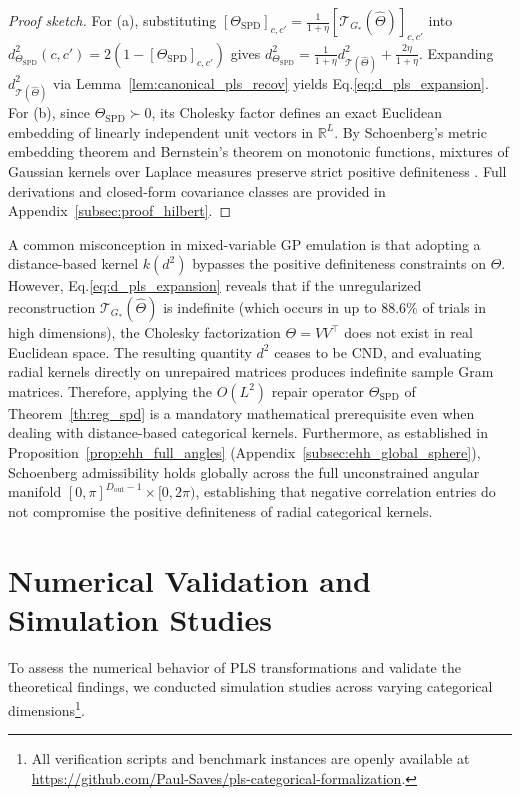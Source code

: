 \documentclass[default,sn-mathphys,Numbered]{sn-jnl}
\theoremstyle{thmstyleone}
\theoremstyle{thmstylethree}
\theoremstyle{thmstyletwo}
\newcommand{\outp}{\text{out}}
\newcommand{\eqnref}[1]{\eqref{#1}}
\begin{document}
\begin{proof}[Proof sketch]
For (a), substituting $[\Theta_{\mathrm{SPD}}]_{c, c'} = \frac{1}{1+\eta} [\mathcal{T}_{G_*}(\hat{\Theta})]_{c, c'}$ into $d_{\Theta_{\mathrm{SPD}}}^2(c, c') = 2(1 - [\Theta_{\mathrm{SPD}}]_{c, c'})$ gives $d_{\Theta_{\mathrm{SPD}}}^2 = \frac{1}{1+\eta} d_{\mathcal{T}(\hat{\Theta})}^2 + \frac{2\eta}{1+\eta}$. Expanding $d_{\mathcal{T}(\hat{\Theta})}^2$ via Lemma~\ref{lem:canonical_pls_recov} yields Eq.\eqnref{eq:d_pls_expansion}. For (b), since $\Theta_{\mathrm{SPD}} \succ 0$, its Cholesky factor defines an exact Euclidean embedding of linearly independent unit vectors in $\mathbb{R}^L$. By Schoenberg's metric embedding theorem \citep{schoenberg1938metric} and Bernstein's theorem on  monotonic functions, mixtures of Gaussian kernels over Laplace measures preserve strict positive definiteness \citep{micchelli1986interpolation}. Full derivations and closed-form covariance classes are provided in Appendix~\ref{subsec:proof_hilbert}.
\end{proof}


A common misconception in mixed-variable GP emulation is that adopting a distance-based kernel $k(d^2)$ bypasses the positive definiteness constraints on $\Theta$. However, Eq.\eqnref{eq:d_pls_expansion} reveals that if the unregularized reconstruction $\mathcal{T}_{G_*}(\hat{\Theta})$ is indefinite (which occurs in up to $88.6\%$ of trials in high dimensions), the Cholesky factorization $\Theta = V V^\top$ does not exist in real Euclidean space. The resulting quantity $d^2$ ceases to be CND, and evaluating radial kernels directly on unrepaired matrices produces indefinite sample Gram matrices. Therefore, applying the $O(L^2)$ repair operator $\Theta_{\mathrm{SPD}}$ of Theorem~\ref{th:reg_spd} is a mandatory mathematical prerequisite even when dealing with distance-based categorical kernels. Furthermore, as established in Proposition~\ref{prop:ehh_full_angles} (Appendix~\ref{subsec:ehh_global_sphere}), Schoenberg admissibility holds globally across the full unconstrained angular manifold $[0, \pi]^{D_{\outp}-1} \times [0, 2\pi)$, establishing that negative correlation entries do not compromise the positive definiteness of radial categorical kernels.

\section{Numerical Validation and Simulation Studies}
\label{sec:simulations}

To assess the numerical behavior of PLS transformations and validate the theoretical findings, we conducted simulation studies across varying categorical dimensions\footnote{All verification scripts and benchmark instances are openly available at \url{https://github.com/Paul-Saves/pls-categorical-formalization}.}.
\end{document}
